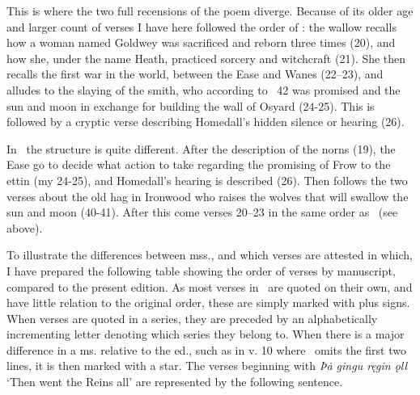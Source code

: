 This is where the two full recensions of the poem diverge. Because of its older age and larger count of verses I have here followed the order of \Regius: the wallow recalls how a woman named Goldwey was sacrificed and reborn three times (20), and how she, under the name Heath, practiced sorcery and witchcraft (21). She then recalls the first war in the world, between the Ease and Wanes (22–23), and alludes to the slaying of the smith, who according to \Gylfaginning\ 42 was promised  and the sun and moon in exchange for building the wall of Osyard (24-25). This is followed by a cryptic verse describing Homedall’s hidden silence or hearing (26).

In \Hauksbok\ the structure is quite different. After the description of the norns (19), the Ease go to decide what action to take regarding the promising of Frow to the ettin (my 24-25), and Homedall’s hearing is described (26). Then follows the two verses about the old hag in Ironwood who raises the wolves that will swallow the sun and moon (40-41). After this come verses 20–23 in the same order as \Regius\ (see above).

To illustrate the differences between mss., and which verses are attested in which, I have prepared the following table showing the order of verses by manuscript, compared to the present edition. As most verses in \GylfMS\ are quoted on their own, and have little relation to the original order, these are simply marked with plus signs. When verses are quoted in a series, they are preceded by an alphabetically incrementing letter denoting which series they belong to. When there is a major difference in a ms. relative to the ed., such as in v. 10 where \GylfMS\ omits the first two lines, it is then marked with a star. The verses beginning with \emph{Þȧ gingu ręgin ǫll} ‘Then went the Reins all’ are represented by the following sentence.

